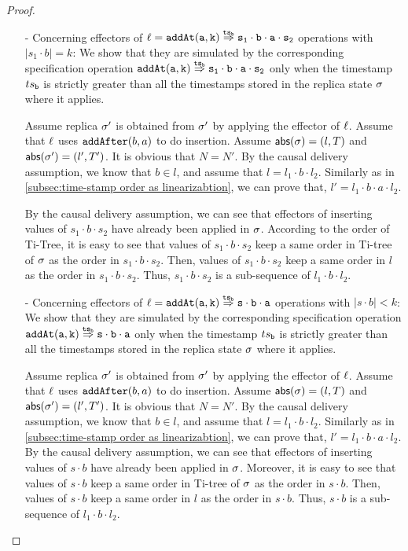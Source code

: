 \begin {proof}
\begin{itemize}
\item[-] Concerning effectors of $\alabel = \alabellongind[{\tt addAt}]{a,k}{s_1 \cdot b \cdot a \cdot s_2}{\ats_b}{}$ operations with $\vert s_1 \cdot b \vert = k$: We show that they are simulated by the corresponding specification operation $\alabellongind[{\tt addAt}]{a,k}{s_1 \cdot b \cdot a \cdot s_2}{\ats_b}{}$ only when the timestamp $\ats_{\tt b}$ is strictly greater than all the timestamps stored in the replica state $\astate$ where it applies.

    Assume replica $\astate'$ is obtained from $\astate'$ by applying the effector of $\alabel$. Assume that $\alabel$ uses $\alabelshort[\mathtt{addAfter}]{b,a}$ to do insertion. Assume $\refmap(\astate) = (l,T)$ and $\refmap(\astate') = (l',T')$. It is obvious that $N = N'$. By the causal delivery assumption, we know that $b \in l$, and assume that $l = l_1 \cdot b \cdot l_2$. Similarly as in \sectionautorefname \ref{subsec:time-stamp order as linearizabtion}, we can prove that, $l' = l_1 \cdot b \cdot a \cdot l_2$.

    By the causal delivery assumption, we can see that effectors of inserting values of $s_1 \cdot b \cdot s_2$ have already been applied in $\astate$. According to the order of Ti-Tree, it is easy to see that values of $s_1 \cdot b \cdot s_2$ keep a same order in Ti-tree of $\astate$ as the order in $s_1 \cdot b \cdot s_2$. Then, values of $s_1 \cdot b \cdot s_2$ keep a same order in $l$ as the order in $s_1 \cdot b \cdot s_2$. Thus, $s_1 \cdot b \cdot s_2$ is a sub-sequence of $l_1 \cdot b \cdot l_2$.

\item[-] Concerning effectors of $\alabel = \alabellongind[{\tt addAt}]{a,k}{s \cdot b \cdot a}{\ats_b}{}$ operations with $\vert s \cdot b \vert < k$: We show that they are simulated by the corresponding specification operation $\alabellongind[{\tt addAt}]{a,k}{s \cdot b \cdot a}{\ats_b}{}$ only when the timestamp $\ats_{\tt b}$ is strictly greater than all the timestamps stored in the replica state $\astate$ where it applies.

    Assume replica $\astate'$ is obtained from $\astate'$ by applying the effector of $\alabel$. Assume that $\alabel$ uses $\alabelshort[\mathtt{addAfter}]{b,a}$ to do insertion. Assume $\refmap(\astate) = (l,T)$ and $\refmap(\astate') = (l',T')$. It is obvious that $N = N'$. By the causal delivery assumption, we know that $b \in l$, and assume that $l = l_1 \cdot b \cdot l_2$. Similarly as in \sectionautorefname \ref{subsec:time-stamp order as linearizabtion}, we can prove that, $l' = l_1 \cdot b \cdot a \cdot l_2$. By the causal delivery assumption, we can see that effectors of inserting values of $s \cdot b$ have already been applied in $\astate$. Moreover, it is easy to see that values of $s \cdot b$ keep a same order in Ti-tree of $\astate$ as the order in $s \cdot b$. Then, values of $s \cdot b$ keep a same order in $l$ as the order in $s \cdot b$. Thus, $s \cdot b$ is a sub-sequence of $l_1 \cdot b \cdot l_2$.


\end{itemize}
\end{proof}
